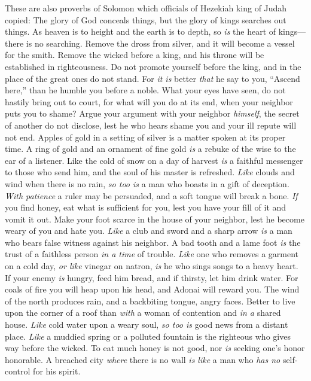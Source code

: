 \begin{biblechapter} %
 These are also proverbs of Solomon which officials of Hezekiah king of Judah copied:
\verse The glory of God conceals things, 
but the glory of kings searches out things.
\verse As heaven is to height and the earth is to depth, 
so \textit{is} the heart of kings—there is no searching.
\verse Remove the dross from silver, 
and it will become a vessel for the smith.
\verse Remove the wicked before a king, 
and his throne will be established in righteousness.
\verse Do not promote yourself before the king, 
and in the place of the great ones do not stand.
\verse For \textit{it is} better \textit{that} he say to you, “Ascend here,” 
than he humble you before a noble. 
What your eyes have seen,
\verse do not hastily bring out to court, 
for what will you do at its end, 
when your neighbor puts you to shame?
\verse Argue your argument with your neighbor \textit{himself}, 
the secret of another do not disclose,
\verse lest he who hears shame you 
and your ill repute will not end.
\verse Apples of gold in a setting of silver 
is a matter spoken at its proper time.
\verse A ring of gold and an ornament of fine gold 
\textit{is} a rebuke of the wise to the ear of a listener.
\verse Like the cold of snow on a day of harvest 
\textit{is} a faithful messenger to those who send him, 
and the soul of his master is refreshed.
\verse \textit{Like} clouds and wind when there is no rain, 
\textit{so too is} a man who boasts in a gift of deception.
\verse \textit{With patience} a ruler may be persuaded, 
and a soft tongue will break a bone.
\verse \textit{If} you find honey, eat what is sufficient for you, 
lest you have your fill of it and vomit it out.
\verse Make your foot scarce in the house of your neighbor, 
lest he become weary of you and hate you.
\verse \textit{Like} a club and sword and a sharp arrow 
\textit{is} a man who bears false witness against his neighbor.
\verse A bad tooth and a lame foot 
\textit{is} the trust of a faithless person \textit{in a time} of trouble.
\verse \textit{Like} one who removes a garment on a cold day, \textit{or like} vinegar on natron, 
\textit{is} he who sings songs to a heavy heart.
\verse If your enemy \textit{is} hungry, feed him bread, 
and if thirsty, let him drink water.
\verse For coals of fire you will heap upon his head, 
and Adonai will reward you.
\verse The wind of the north produces rain, 
and a backbiting tongue, angry faces.
\verse Better to live upon the corner of a roof 
than \textit{with} a woman of contention and \textit{in a} shared house.
\verse \textit{Like} cold water upon a weary soul, 
\textit{so too is} good news from a distant place.
\verse \textit{Like} a muddied spring or a polluted fountain 
is the righteous who gives way before the wicked.
\verse To eat much honey is not good, 
nor \textit{is} seeking one’s honor honorable.
\verse A breached city \textit{where} there is no wall 
\textit{is like} a man who \textit{has no} self-control for his spirit.
\end{biblechapter}


